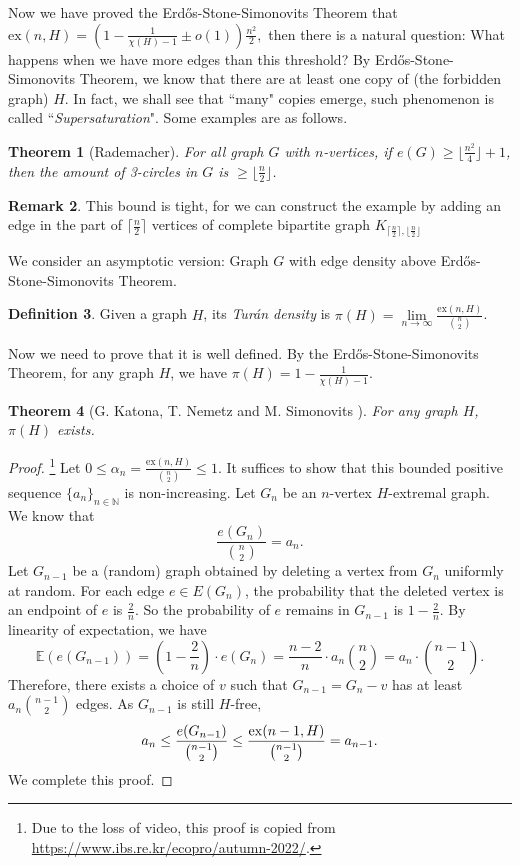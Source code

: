 \documentclass{article}
\newtheorem{theorem}{Theorem}[section]
\theoremstyle{definition}
\newtheorem{remark}[theorem]{Remark}
\newtheorem{definition}[theorem]{Definition}
\newcommand{\ex}{\mathrm{ex}}
\def\Erdos{Erd\H{o}s}
\def\Turan{Tur\'an}
\begin{document}
Now we have proved the \Erdos{}-Stone-Simonovits Theorem that $\ex(n,H) = \left(1- \frac{1}{\chi(H) - 1} \pm o(1) \right) \frac{n^2}{2},$ then there is a natural question: What happens when we have more edges than this threshold? By \Erdos{}-Stone-Simonovits Theorem, we know that there are at least one copy of (the forbidden graph) $H$. In fact, we shall see that ``many" copies emerge, such phenomenon is called ``\emph{Supersaturation}". Some examples are as follows.

\begin{theorem}[Rademacher\cite{erdos1962Rademacher}]
    For all graph $G$ with $n$-vertices, if $e(G)\geq \lfloor\frac{n^2}{4}\rfloor+1$, then the amount of 3-circles in $G$ is $\geq\lfloor\frac{n}{2}\rfloor$.
\end{theorem}

\begin{remark}
    This bound is tight, for we can construct the example by adding an edge in the part of $\lceil \frac{n}{2} \rceil$ vertices of complete bipartite graph $K_{\lceil \frac{n}{2} \rceil,\lfloor\frac{n}{2}\rfloor}$
\end{remark}

We consider an asymptotic version: Graph $G$ with edge density above \Erdos{}-Stone-Simonovits Theorem.

\begin{definition}
	Given a graph $H$, its \emph{\Turan{} density} is $\pi(H)=\lim\limits_{n \to \infty} \frac{\ex(n,H)}{\binom{n}{2}}$.
\end{definition}

Now we need to prove that it is well defined. By the \Erdos{}-Stone-Simonovits Theorem, for any graph $H$, we have $\pi (H)=1-\frac{1}{\chi (H)-1} $.

\begin{theorem}[G. Katona, T. Nemetz and M. Simonovits \cite{Katona1964exist}]
    For any graph $H$, $\pi(H)$ exists.
\end{theorem}

\begin{proof}\footnote{Due to the loss of video, this proof is copied from \url{https://www.ibs.re.kr/ecopro/autumn-2022/}.}
    Let $0\leq\alpha_n=\frac{\ex(n,H)}{\binom{n}{2}}\leq 1$. It suffices to show that this bounded positive sequence $\{a_{n}\}_{n\in \mathbb{N} }$ is non-increasing.
	Let $G_n$ be an $n$-vertex $H$-extremal graph. We know that $$\frac{e(G_{n})}{\binom{n}{2}} =a_{n} .$$
    Let $G_{n-1}$ be a (random) graph obtained by deleting a vertex from $G_n$ uniformly at random.
    For each edge $e\in E(G_{n})$, the probability that the deleted vertex is an endpoint of $e$ is $\frac{2}{n} $. So the probability of $e$ remains in $G_{n-1}$ is $1-\frac{2}{n}$.
    By linearity of expectation, we have 
    $$\mathbb{E} (e(G_{n-1}))=\left (  1-\frac{2}{n} \right ) \cdot e(G_{n})=\frac{n-2}{n} \cdot a_{n}\binom{n}{2} =a_{n}\cdot \binom{n-1}{2} .$$
    Therefore, there exists a choice of $v$ such that $G_{n-1}=G_{n}-v$ has at least $a_{n}\binom{n-1}{2}$ edges.
    As $G_{n-1}$ is still $H$-free,
    $$ a_{n}\le \frac{e(G_{n-1})}{\binom{n-1}{2} } \le \frac{{\rm ex}(n-1,H)}{\binom{n-1}{2} } =a_{n-1} . $$
    We complete this proof.
\end{proof}
\end{document}
